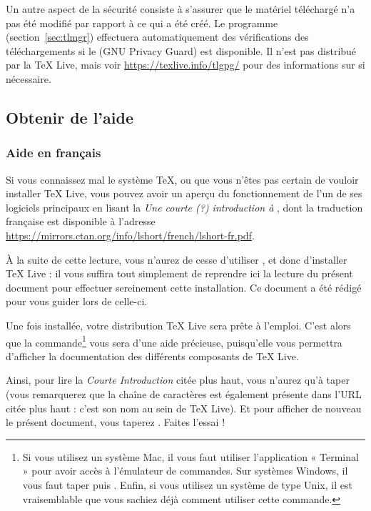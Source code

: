 \documentclass[german, english, french, 12pt]{article}
\renewcommand{\TL}{\TeX{} Live\xspace}%
\begin{document}
Un autre aspect de la sécurité consiste à s'assurer que le matériel téléchargé
n'a pas été modifié par rapport à ce qui a été créé. Le programme 
(section~\ref{sec:tlmgr}) effectuera automatiquement des vérifications des
téléchargements si le  (GNU Privacy Guard) est disponible. Il n'est
pas distribué par la \TL, mais voir \url{https://texlive.info/tlgpg/} pour des
informations sur  si nécessaire.

\subsection{Obtenir de l'aide}
\label{sec:help}
\subsubsection{Aide en français}
Si vous connaissez mal le système \TeX{}, ou que vous n'êtes pas certain de
vouloir installer \TL{}, vous pouvez avoir un aperçu du fonctionnement de l'un
de ses logiciels principaux en lisant la \emph{Une courte (\string?)
  introduction à \LaTeXe{}}, dont la traduction française est disponible
à l'adresse \url{https://mirrors.ctan.org/info/lshort/french/lshort-fr.pdf}.

À la suite de cette lecture, vous n'aurez de cesse d'utiliser \LaTeXe{}, et donc
d'installer \TL{} : il vous suffira tout simplement de reprendre ici la lecture
du présent document pour effectuer sereinement cette installation.  Ce document
a été rédigé pour vous guider lors de celle-ci.

Une fois installée, votre distribution \TL{} sera prête à l'emploi.  C'est alors
que la commande\footnote{Si vous utilisez un système Mac, il vous faut utiliser
  l'application « Terminal » pour avoir accès à l'émulateur de commandes.  Sur
  systèmes Windows, il vous faut taper  puis .  Enfin, si
  vous utilisez un système de type Unix, il est vraisemblable que vous sachiez
  déjà comment utiliser cette commande.}  vous sera d'une aide
précieuse, puisqu'elle vous permettra d'afficher la documentation des différents
composants de \TL{}.

Ainsi, pour lire la \emph{Courte Introduction} citée plus haut, vous n'aurez
qu'à taper  (vous remarquerez que la chaîne de caractères
 est également présente dans l'URL citée plus haut : c'est son
nom au sein de \TL{}).  Et pour afficher de nouveau le présent document, vous
taperez . Faites l'essai !
\end{document}
